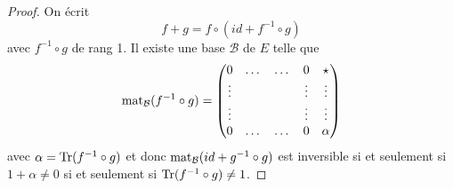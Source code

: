 \documentclass[12pt]{article}
\begin{document}
\begin{proof}
    On écrit 
    \begin{equation}
        f+g=f\circ\left(id+f^{-1}\circ g\right)
    \end{equation}
    avec $f^{-1}\circ g$ de rang 1. Il existe une base $\mathcal{B}
    $ de $E$ telle que 
    \begin{equation}
        \operatorname{mat}_{\mathcal{B}}(f^{-1}\circ g)=
        \begin{pmatrix}
            0 & \dots & \dots & 0 & \star\\
            \vdots & & &\vdots &\vdots\\
            \vdots & & &\vdots & \vdots\\
            0 & \dots & \dots & 0 & \alpha
        \end{pmatrix}
    \end{equation}
    avec $\alpha=\operatorname{Tr}(f^{-1}\circ g)$ et donc $\operatorname{mat}_{\mathcal{B}}(id+g^{-1}\circ g)$ est inversible si et seulement si $1+\alpha\neq0$ si et seulement si $\operatorname{Tr}(f^{-1}\circ g)\neq 1$.
\end{proof}
\end{document}
